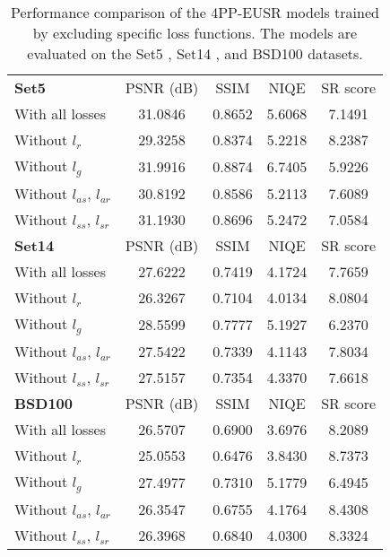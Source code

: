 \documentclass[runningheads]{llncs}
\begin{document}
\begin{table}[t]
	\scriptsize
	\centering
	\caption{Performance comparison of the 4PP-EUSR models trained by excluding specific loss functions. The models are evaluated on the Set5 \cite{bevilacqua2012low}, Set14 \cite{zeyde2010single}, and BSD100 \cite{martin2001database} datasets.}
	\label{table:result_loss_comparison}
	\begin{tabular}{lcccc}
		\\
		\textbf{Set5} & PSNR (dB) & SSIM & NIQE & SR score \\
		\noalign{\smallskip}
		\hline
		\noalign{\smallskip}
		With all losses & 31.0846 & 0.8652 & 5.6068 & 7.1491 \\
		Without ${l}_{r}$ & 29.3258 & 0.8374 & 5.2218 & 8.2387 \\
		Without ${l}_{g}$ & 31.9916 & 0.8874 & 6.7405 & 5.9226 \\
		Without ${l}_{as}$, ${l}_{ar}$ & 30.8192 & 0.8586 & 5.2113 & 7.6089 \\
		Without ${l}_{ss}$, ${l}_{sr}$ & 31.1930 & 0.8696 & 5.2472 & 7.0584 \\
		\noalign{\smallskip}
		\noalign{\smallskip}
		\textbf{Set14} & PSNR (dB) & SSIM & NIQE & SR score \\
		\noalign{\smallskip}
		\hline
		\noalign{\smallskip}
		With all losses & 27.6222 & 0.7419 & 4.1724 & 7.7659 \\
		Without ${l}_{r}$ & 26.3267 & 0.7104 & 4.0134 & 8.0804 \\
		Without ${l}_{g}$ & 28.5599 & 0.7777 & 5.1927 & 6.2370 \\
		Without ${l}_{as}$, ${l}_{ar}$ & 27.5422 & 0.7339 & 4.1143 & 7.8034 \\
		Without ${l}_{ss}$, ${l}_{sr}$ & 27.5157 & 0.7354 & 4.3370 & 7.6618 \\
		\noalign{\smallskip}
		\noalign{\smallskip}
		\textbf{BSD100} & PSNR (dB) & SSIM & NIQE & SR score \\
		\noalign{\smallskip}
		\hline
		\noalign{\smallskip}
		With all losses & 26.5707 & 0.6900 & 3.6976 & 8.2089 \\
		Without ${l}_{r}$ & 25.0553 & 0.6476 & 3.8430 & 8.7373 \\
		Without ${l}_{g}$ & 27.4977 & 0.7310 & 5.1779 & 6.4945 \\
		Without ${l}_{as}$, ${l}_{ar}$ & 26.3547 & 0.6755 & 4.1764 & 8.4308 \\
		Without ${l}_{ss}$, ${l}_{sr}$ & 26.3968 & 0.6840 & 4.0300 & 8.3324
	\end{tabular}
\end{table}
\end{document}
